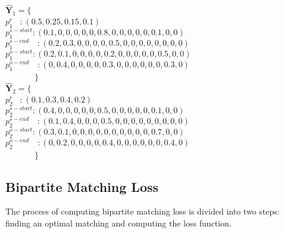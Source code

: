 \documentclass[letterpaper]{article} \usepackage{aaai21}  \usepackage{times}  \usepackage{helvet} \usepackage{courier}  \usepackage[hyphens]{url}  \usepackage{graphicx} \usepackage{amsfonts,amssymb}
\begin{document}
\noindent $\hat{\mathbf{Y}}_1 = \{$ \\
\indent \quad \quad  $p_1^r$ \quad   \quad\, :$\ (0.5, 0.25, 0.15, 0.1)$
\\
\indent \quad \quad   $p_1^{s-start}: (0.1, 0, 0, 0, 0, 0, 0.8, 0,0,0,0,0,0.1,0,0)$\\
\indent \quad \quad  $p_1^{s-end}\quad\!\!\! : (0.2, 0.3, 0, 0, 0, 0, 0.5, 0,0,0,0,0,0,0,0)$\\
\indent \quad \quad   $p_1^{o-start}: (0.2, 0.1, 0, 0, 0, 0, 0.2, 0,0,0,0,0,0.5,0,0)$\\
\indent \quad \quad  $p_1^{o-end}\quad\!\!\! : (0, 0.4, 0, 0, 0, 0, 0.3, 0,0,0,0,0,0,0.3,0)$\\
\indent \ \ \ \ \ \ \  $\}$ \\

\noindent $\hat{\mathbf{Y}}_2 = \{$ \\
\indent \quad \quad $p_2^r$ \quad   \quad\, :$\ (0.1, 0.3, 0.4, 0.2)$
\\
\indent \quad \quad $p_2^{s-start}: (0.4, 0, 0, 0, 0, 0,0.5, 0,0,0,0,0,0.1,0,0)$\\
\indent \quad \quad $p_2^{s-end}\quad\!\!\! : (0.1, 0.4, 0, 0, 0, 0.5, 0, 0, 0, 0, 0, 0, 0, 0, 0)$\\
\indent \quad \quad $p_2^{o-start}: (0.3, 0.1, 0, 0, 0, 0, 0, 0, 0, 0, 0, 0, 0.7, 0, 0)$\\
\indent \quad \quad $p_2^{o-end}\quad\!\!\! : (0, 0.2, 0, 0, 0, 0, 0.4, 0, 0, 0, 0,0 ,0,0.4,0)$\\
\indent \ \ \ \ \ \ \  $\}$
\subsection{Bipartite Matching Loss}
The process of computing bipartite matching loss is divided into two steps: finding an optimal matching and computing the loss function.\\
\end{document}
